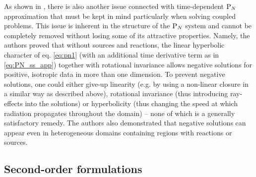 As shown in \cite{McClarren4}, there is also another issue connected with time-dependent $\text{P}_{N}$ approximation that must
be kept in mind particularly when solving coupled problems. This issue is inherent in the structure of the $\text{P}_{N}$ system
and cannot be completely removed without losing some of its attractive properties. Namely, the authors proved that
without sources and reactions, the linear hyperbolic character of eq. \eqref{eq:pn1} (with an additional time derivative
term as in \eqref{eq:PN_ss_app}) together with rotational invariance allows negative solutions for positive, isotropic
data in more than one dimension. To prevent negative solutions, one could either give-up linearity (e.g. by using a
non-linear closure in a similar way as described above), rotational invariance (thus introducing ray-effects into the solutions) or
hyperbolicity (thus changing the speed at which radiation propagates throughout the domain) -- none of which is a
generally satisfactory remedy. The authors also demonstrated that negative solutions can appear even in heterogeneous
domains containing regions with reactions or sources.

\subsection{Second-order formulations}\label{sec:second-order}

